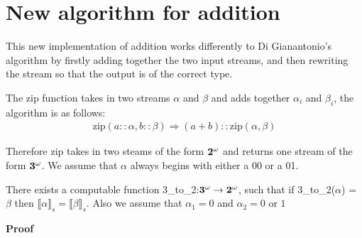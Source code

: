 \documentclass{cs4rep}
\begin{document}
\section{New algorithm for addition} \label{sec:addition}

This new implementation of addition works differently to Di
Gianantonio's algorithm by firstly adding together the two input
streams, and then rewriting the stream so that the output is of the
correct type.

The zip function takes in two streams $\alpha$ and $\beta$ and adds
together $\alpha_{i}$ and $\beta_{i}$, the algorithm is as follows:
\[ \begin{array}{l}
\mbox{zip}(a::\alpha,b::\beta) \Rightarrow (a+b)::\mbox{zip}(\alpha,\beta)
\end{array} \]

Therefore zip takes in two steams of the form ${\bf 2}^{\omega}$ and
returns one stream of the form ${\bf 3}^{\omega}$. We assume that
$\alpha$ always begins with either a 00 or a 01.

\begin{myprop} \label{eq:add1}
  There exists a computable function 3\_to\_2:${\bf 3^{\omega}}
  \rightarrow {\bf 2^{\omega}}$, such that if 3\_to\_2($ \alpha $) = $
  \beta $ then $ \llbracket \alpha \rrbracket_{s} = \llbracket \beta
  \rrbracket_{s} $. Also we assume that $\alpha_{1} = 0$ and
  $\alpha_{2} = 0$ or $1$
\end{myprop}

{\bf Proof}
\end{document}
